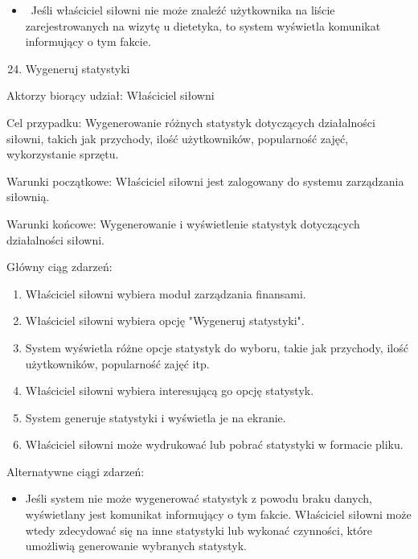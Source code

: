 \documentclass[
]{article}
\providecommand{\tightlist}{%
  \setlength{\itemsep}{0pt}\setlength{\parskip}{0pt}}
\begin{document}
\begin{itemize}
\tightlist
\item
  {~Jeśli właściciel siłowni nie może znaleźć użytkownika na liście
  zarejestrowanych na wizytę u dietetyka, to system wyświetla komunikat
  informujący o tym fakcie.}
\end{itemize}

{}

{}

{}

\begin{enumerate}
\setcounter{enumi}{23}
\tightlist
\item
  {Wygeneruj statystyki}
\end{enumerate}

{Aktorzy biorący udział: Właściciel siłowni}

{Cel przypadku: Wygenerowanie różnych statystyk dotyczących działalności
siłowni, takich jak przychody, ilość użytkowników, popularność zajęć,
wykorzystanie sprzętu.}

{Warunki początkowe: Właściciel siłowni jest zalogowany do systemu
zarządzania siłownią.}

{Warunki końcowe: Wygenerowanie i wyświetlenie statystyk dotyczących
działalności siłowni.}

{Główny ciąg zdarzeń:}

\begin{enumerate}
\tightlist
\item
  {Właściciel siłowni wybiera moduł zarządzania finansami.}
\item
  {Właściciel siłowni wybiera opcję "Wygeneruj statystyki".}
\item
  {System wyświetla różne opcje statystyk do wyboru, takie jak
  przychody, ilość użytkowników, popularność zajęć itp.}
\item
  {Właściciel siłowni wybiera interesującą go opcję statystyk.}
\item
  {System generuje statystyki i wyświetla je na ekranie.}
\item
  {Właściciel siłowni może wydrukować lub pobrać statystyki w formacie
  pliku.}
\end{enumerate}

{Alternatywne ciągi zdarzeń:}

\begin{itemize}
\tightlist
\item
  {Jeśli system nie może wygenerować statystyk z powodu braku danych,
  wyświetlany jest komunikat informujący o tym fakcie. Właściciel
  siłowni może wtedy zdecydować się na inne statystyki lub wykonać
  czynności, które umożliwią generowanie wybranych statystyk.}
\end{itemize}
\end{document}
